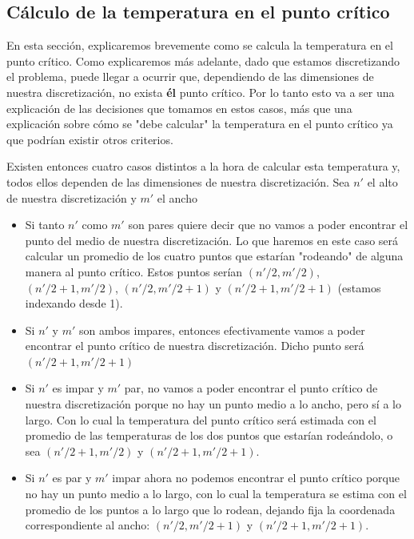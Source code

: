 \subsection{Cálculo de la temperatura en el punto crítico}
En esta sección, explicaremos brevemente como se calcula la temperatura en el punto crítico. Como explicaremos más adelante, dado que estamos discretizando el problema, puede llegar a ocurrir que, dependiendo de las dimensiones de nuestra discretización, no exista \textbf{él} punto crítico. Por lo tanto esto va a ser una explicación de las decisiones que tomamos en estos casos, más que una explicación sobre cómo se "debe calcular" la temperatura en el punto crítico ya que podrían existir otros criterios.
\par Existen entonces cuatro casos distintos a la hora de calcular esta temperatura y, todos ellos dependen de las dimensiones de nuestra discretización. Sea $n'$ el alto de nuestra discretización y $m'$ el ancho
\begin{itemize}
\item Si tanto $n'$ como $m'$ son pares quiere decir que no vamos a poder encontrar el punto del medio de nuestra discretización. Lo que haremos en este caso será calcular un promedio de los cuatro puntos que estarían "rodeando" de alguna manera al punto crítico. Estos puntos serían $(n'/2, m'/2)$, $(n'/2 + 1, m'/2)$, $(n'/2, m'/2 + 1)$ y $(n'/2 + 1, m'/2 + 1)$ (estamos indexando desde 1).
\item Si $n'$ y $m'$ son ambos impares, entonces efectivamente vamos a poder encontrar el punto crítico de nuestra discretización. Dicho punto será $(n'/2 + 1, m'/2 + 1)$
\item Si $n'$ es impar y $m'$ par, no vamos a poder encontrar el punto crítico de nuestra discretización porque no hay un punto medio a lo ancho, pero sí a lo largo. Con lo cual la temperatura del punto crítico será estimada con el promedio de las temperaturas de los dos puntos que estarían rodeándolo, o sea $(n'/2 + 1, m'/2)$ y $(n'/2 +1, m'/2 + 1)$.
\item Si $n'$ es par y $m'$ impar ahora no podemos encontrar el punto crítico porque no hay un punto medio a lo largo, con lo cual la temperatura se estima con el promedio de los puntos a lo largo que lo rodean, dejando fija la coordenada correspondiente al ancho: $(n'/2, m'/2 + 1)$ y $(n'/2 + 1, m'/2 + 1)$.
\end{itemize}

